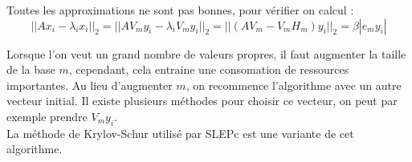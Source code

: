 Toutes les approximations ne sont pas bonnes, pour vérifier on calcul :
\[
||Ax_i-\lambda_ix_i||_2 = ||AV_my_i-\lambda_iV_my_i||_2 = ||(AV_m-V_mH_m)y_i||_2 = \beta|e_my_i|
\]

Lorsque l'on veut un grand nombre de valeurs propres, il faut augmenter la taille de la base $m$, cependant, cela entraine une consomation de ressources importantes. Au lieu d'augmenter $m$, on recommence l'algorithme avec un autre vecteur initial. Il existe plusieurs méthodes pour choisir ce vecteur, on peut par exemple prendre $V_my_i$.\\

La méthode de Krylov-Schur utilisé par SLEPc est une variante de cet algorithme.
